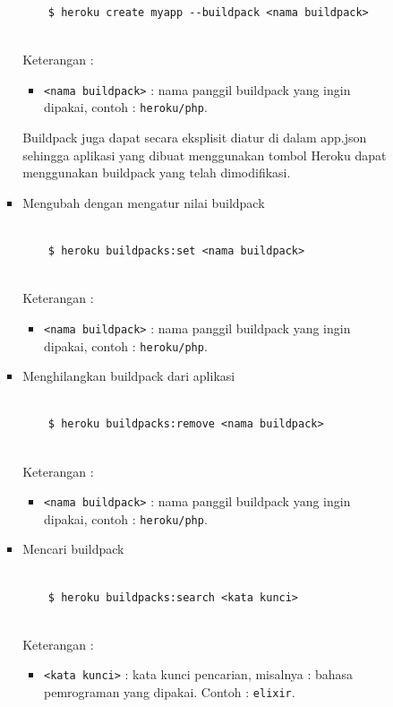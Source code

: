 \documentclass[a4paper,twoside]{article}
\begin{document}
\begin{enumerate}
\begin{enumerate}
\begin{itemize}
\begin{itemize}
\begin{lstlisting}
	$ heroku create myapp --buildpack <nama buildpack>
	
\end{lstlisting}
Keterangan :
\begin{itemize}
\item \texttt{<nama buildpack>} : nama panggil buildpack yang ingin dipakai, contoh : \texttt{heroku/php}.
\end{itemize}

Buildpack juga dapat secara eksplisit diatur di dalam app.json sehingga aplikasi yang dibuat menggunakan tombol Heroku dapat menggunakan buildpack yang telah dimodifikasi.

\item Mengubah dengan mengatur nilai buildpack

\begin{lstlisting}

	$ heroku buildpacks:set <nama buildpack>
	
\end{lstlisting}
Keterangan :
\begin{itemize}
\item \texttt{<nama buildpack>} : nama panggil buildpack yang ingin dipakai, contoh : \texttt{heroku/php}.
\end{itemize}

\item Menghilangkan buildpack dari aplikasi

\begin{lstlisting}

	$ heroku buildpacks:remove <nama buildpack>
	
\end{lstlisting}
Keterangan :
\begin{itemize}
\item \texttt{<nama buildpack>} : nama panggil buildpack yang ingin dipakai, contoh : \texttt{heroku/php}.
\end{itemize}

\item Mencari buildpack

\begin{lstlisting}

	$ heroku buildpacks:search <kata kunci>
	
\end{lstlisting}
Keterangan :
\begin{itemize}
\item \texttt{<kata kunci>} : kata kunci pencarian, misalnya : bahasa pemrograman yang dipakai. Contoh : \texttt{elixir}.
\end{itemize}


\end{itemize}
\end{itemize}
\end{enumerate}
\end{enumerate}
\end{document}
